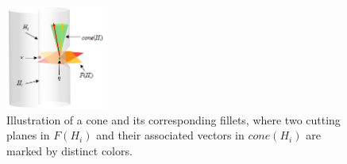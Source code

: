 









\begin{figure}[t]
  \centering
  \includegraphics[width=0.3\textwidth]{figs/cone-fillet.png}
  \caption{\label{fig:fillets}%
           Illustration of a cone and its corresponding fillets, where two cutting planes in $F(H_i)$ and their associated vectors in $cone(H_i)$ are marked by distinct colors.}
\end{figure}


